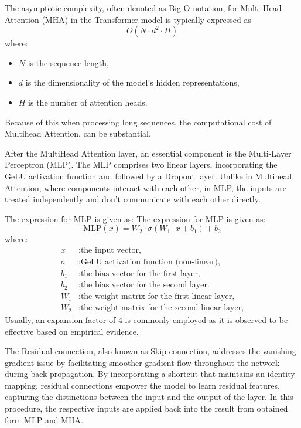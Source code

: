 \noindent The asymptotic complexity, often denoted as Big O notation, for Multi-Head Attention (MHA) in the Transformer model is typically expressed as\[ O(N \cdot d^2 \cdot H)\]
\noindent where:
\begin{itemize}
    \item $N$ is the sequence length,
    \item $d$ is the dimensionality of the model's hidden representations,
    \item $H$ is the number of attention heads.
\end{itemize}
\noindent Because of this when processing long sequences, the computational cost of Multihead Attention, can be substantial.

\noindent After the MultiHead Attention layer, an essential component is the Multi-Layer Perceptron (MLP). The MLP comprises two linear layers, incorporating the GeLU activation function and followed by a Dropout layer. Unlike in Multihead Attention, where components interact with each other, in MLP, the inputs are treated independently and don't communicate with each other directly.

\noindent The expression for MLP is given as:
\noindent The expression for MLP is given as:
\begin{equation}
    \text{MLP}(x) = W_2 \cdot \sigma(W_1 \cdot x + b_1) + b_2 \label{eq:mlp}
\end{equation}
where:
\begin{align*}
    x      & : \text{the input vector,}                              \\
    \sigma & : \text{GeLU activation function (non-linear),}         \\
    b_1    & : \text{the bias vector for the first layer,}           \\
    b_2    & : \text{the bias vector for the second layer.}          \\
    W_1    & : \text{the weight matrix for the first linear layer,}  \\
    W_2    & : \text{the weight matrix for the second linear layer,}
\end{align*}
Usually, an expansion factor of 4 is commonly employed as it is observed to be effective based on empirical evidence.

\noindent The Residual connection, also known as Skip connection, addresses the vanishing gradient issue by facilitating smoother gradient flow throughout the network during back-propagation. By incorporating a shortcut that maintains an identity mapping, residual connections empower the model to learn residual features, capturing the distinctions between the input and the output of the layer. In this procedure, the respective inputs are applied back into the result from obtained form MLP and MHA.

